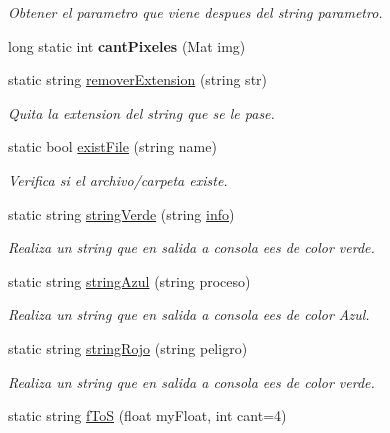 \begin{DoxyCompactItemize}
\begin{DoxyCompactList}\small\item\em Obtener el parametro que viene despues del string parametro. \end{DoxyCompactList}\item 
\mbox{\label{classCommonFunctions_a96f64cedaa73dd2c2412f98beae60348}} 
long static int {\bfseries cant\+Pixeles} (Mat img)
\item 
static string \mbox{\hyperlink{classCommonFunctions_a5393a67a9e631a763fe5874174e386d0}{remover\+Extension}} (string str)
\begin{DoxyCompactList}\small\item\em Quita la extension del string que se le pase. \end{DoxyCompactList}\item 
static bool \mbox{\hyperlink{classCommonFunctions_a91521d26a009071499a413ef4535ca8a}{exist\+File}} (string name)
\begin{DoxyCompactList}\small\item\em Verifica si el archivo/carpeta existe. \end{DoxyCompactList}\item 
static string \mbox{\hyperlink{classCommonFunctions_a00300c316aebf02cd5917c7335247fba}{string\+Verde}} (string \mbox{\hyperlink{classCommonFunctions_a51a3e18bdcc2c918ebc81f0cc1f47851}{info}})
\begin{DoxyCompactList}\small\item\em Realiza un string que en salida a consola ees de color verde. \end{DoxyCompactList}\item 
static string \mbox{\hyperlink{classCommonFunctions_a62aed3b1ac21b7d1d813e39be5693dc1}{string\+Azul}} (string proceso)
\begin{DoxyCompactList}\small\item\em Realiza un string que en salida a consola ees de color Azul. \end{DoxyCompactList}\item 
static string \mbox{\hyperlink{classCommonFunctions_a2d9910d407ce3d46d934068f6bacfe08}{string\+Rojo}} (string peligro)
\begin{DoxyCompactList}\small\item\em Realiza un string que en salida a consola ees de color verde. \end{DoxyCompactList}\item 
static string \mbox{\hyperlink{classCommonFunctions_a54f92a4fbce258e4c73bbdcb2f37a594}{f\+ToS}} (float my\+Float, int cant=4)

\end{DoxyCompactItemize}
